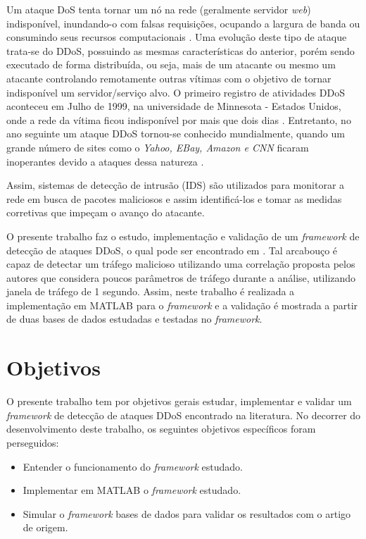 Um ataque DoS tenta tornar um nó na rede (geralmente servidor \textit{web}) indisponível, inundando-o com falsas requisições, ocupando a largura de banda ou consumindo seus recursos computacionais \cite{1638123}. Uma evolução deste tipo de ataque trata-se do DDoS, possuindo as mesmas características do anterior, porém sendo executado de forma distribuída, ou seja, mais de um atacante ou mesmo um atacante controlando remotamente outras vítimas com o objetivo de tornar indisponível um servidor/serviço alvo. O primeiro registro de atividades DDoS aconteceu em Julho de 1999, na universidade de Minnesota - Estados Unidos, onde a rede da vítima ficou indisponível por mais que dois dias \cite{srivastava2011recent}. Entretanto, no ano seguinte um ataque DDoS tornou-se conhecido mundialmente, quando um grande número de sites como o \textit{Yahoo, EBay, Amazon e CNN} ficaram inoperantes devido a ataques dessa natureza \cite{calce2008mafiaboy}.

Assim, sistemas de detecção de intrusão (IDS) são utilizados para monitorar a rede em busca de pacotes maliciosos e assim identificá-los e tomar as medidas corretivas que impeçam o avanço do atacante.

O presente trabalho faz o estudo, implementação e validação de um \textit{framework} de detecção de ataques DDoS, o qual pode ser encontrado em \cite{HOQUE201748}. Tal arcabouço é capaz de detectar um tráfego malicioso utilizando uma correlação proposta pelos autores que considera poucos parâmetros de tráfego durante a análise, utilizando janela de tráfego de 1 segundo. Assim, neste trabalho é realizada a implementação em MATLAB para o \textit{framework} e a validação é mostrada a partir de duas bases de dados estudadas e testadas no \textit{framework}.  

\section{Objetivos}
O presente trabalho tem por objetivos gerais estudar, implementar e validar um \textit{framework} de detecção de ataques DDoS encontrado na literatura. No decorrer do desenvolvimento deste trabalho, os seguintes objetivos específicos foram perseguidos:
\begin{itemize}
	\item Entender o funcionamento do \textit{framework} estudado.
	\item Implementar em MATLAB o \textit{framework} estudado.
	\item Simular o \textit{framework} bases de dados para validar os resultados com o artigo de origem.
\end{itemize}
